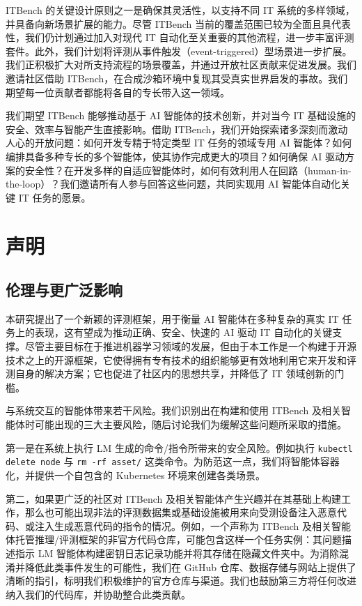 \documentclass[10pt,UTF8,fontset=fandol]{ctexart}
\begin{document}
ITBench 的关键设计原则之一是确保其灵活性，以支持不同 IT 系统的多样领域，并具备向新场景扩展的能力。尽管 ITBench 当前的覆盖范围已较为全面且具代表性，我们仍计划通过加入对现代 IT 自动化至关重要的其他流程，进一步丰富评测套件。此外，我们计划将评测从事件触发（event-triggered）型场景进一步扩展。我们正积极扩大对所支持流程的场景覆盖，并通过开放社区贡献来促进发展。我们邀请社区借助 ITBench，在合成沙箱环境中复现其受真实世界启发的事故。我们期望每一位贡献者都能将各自的专长带入这一领域。

我们期望 ITBench 能够推动基于 AI 智能体的技术创新，并对当今 IT 基础设施的安全、效率与智能产生直接影响。借助 ITBench，我们开始探索诸多深刻而激动人心的开放问题：如何开发专精于特定类型 IT 任务的领域专用 AI 智能体？如何编排具备多种专长的多个智能体，使其协作完成更大的项目？如何确保 AI 驱动方案的安全性？在开发多样的自适应智能体时，如何有效利用人在回路（human-in-the-loop）？我们邀请所有人参与回答这些问题，共同实现用 AI 智能体自动化关键 IT 任务的愿景。

\section{声明}

\subsection{伦理与更广泛影响}

本研究提出了一个新颖的评测框架，用于衡量 AI 智能体在多种复杂的真实 IT 任务上的表现，这有望成为推动正确、安全、快速的 AI 驱动 IT 自动化的关键支撑。尽管主要目标在于推进机器学习领域的发展，但由于本工作是一个构建于开源技术之上的开源框架，它使得拥有专有技术的组织能够更有效地利用它来开发和评测自身的解决方案；它也促进了社区内的思想共享，并降低了 IT 领域创新的门槛。

与系统交互的智能体带来若干风险。我们识别出在构建和使用 ITBench 及相关智能体时可能出现的三大主要风险，随后讨论我们为缓解这些问题所采取的措施。

第一是在系统上执行 LM 生成的命令/指令所带来的安全风险。例如执行 \texttt{kubectl delete node} 与 \texttt{rm -rf asset/} 这类命令。为防范这一点，我们将智能体容器化，并提供一个自包含的 Kubernetes 环境来创建各类场景。

第二，如果更广泛的社区对 ITBench 及相关智能体产生兴趣并在其基础上构建工作，那么也可能出现非法的评测数据集或基础设施被用来向受测设备注入恶意代码、或注入生成恶意代码的指令的情况。例如，一个声称为 ITBench 及相关智能体托管推理/评测框架的非官方代码仓库，可能包含这样一个任务实例：其问题描述指示 LM 智能体构建密钥日志记录功能并将其存储在隐藏文件夹中。为消除混淆并降低此类事件发生的可能性，我们在 GitHub 仓库、数据存储与网站上提供了清晰的指引，标明我们积极维护的官方仓库与渠道。我们也鼓励第三方将任何改进纳入我们的代码库，并协助整合此类贡献。
\end{document}
